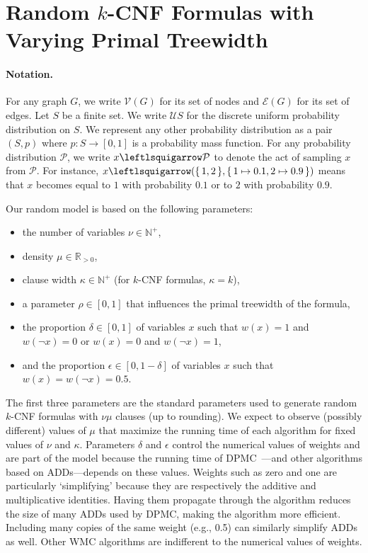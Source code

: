 \documentclass{article}
\theoremstyle{definition}
\begin{document}
\section{Random $k$-CNF Formulas with Varying Primal
  Treewidth}\label{sec:model}

\paragraph{Notation.}
For any graph $G$, we write $\mathcal{V}(G)$ for its set of nodes and
$\mathcal{E}(G)$ for its set of edges. Let $S$ be a finite set. We write
$\mathcal{U}S$ for the discrete uniform probability distribution on $S$. We
represent any other probability distribution as a pair $(S, p)$ where $p\colon S
\to [0, 1]$ is a probability mass function. For any probability distribution
$\mathcal{P}$, we write $x \leftlsquigarrow \mathcal{P}$ to denote the act of
sampling $x$ from $\mathcal{P}$. For instance, $x \leftlsquigarrow (\{\, 1, 2 \,\}, \{\, 1 \mapsto 0.1, 2 \mapsto 0.9 \,\})$ means that $x$ becomes equal to $1$ with probability $0.1$ or to $2$ with probability $0.9$.

Our random model is based on the following parameters:
\begin{itemize}
\item the number of variables $\nu \in \mathbb{N}^+$,
\item density $\mu \in \mathbb{R}_{>0}$,
\item clause width $\kappa \in \mathbb{N}^+$ (for $k$-CNF formulas, $\kappa =
  k$),
\item a parameter $\rho \in [0, 1]$ that influences the primal treewidth of
  the formula,
\item the proportion $\delta \in [0, 1]$ of variables $x$ such that $w(x) = 1$
  and $w(\neg x) = 0$ or $w(x) = 0$ and $w(\neg x) = 1$,
\item and the proportion $\epsilon \in [0, 1-\delta]$ of variables $x$ such that
  $w(x) = w(\neg x) = 0.5$.
\end{itemize}
The first three parameters are the standard parameters used to generate random
$k$-CNF formulas with $\nu\mu$ clauses (up to rounding). We expect to observe
(possibly different) values of $\mu$ that maximize the running time of each
algorithm for fixed values of $\nu$ and $\kappa$. Parameters $\delta$ and
$\epsilon$ control the numerical values of weights and are part of the model
because the running time of \textsc{DPMC}~\cite{DBLP:conf/cp/DudekPV20}---and
other algorithms based on ADDs---depends on these values. Weights such as zero
and one are particularly `simplifying' because they are respectively the
additive and multiplicative identities. Having them propagate through the
algorithm reduces the size of many ADDs used by \textsc{DPMC}, making the
algorithm more efficient. Including many copies of the same weight (e.g., 0.5)
can similarly simplify ADDs as well. Other \textsf{WMC} algorithms are
indifferent to the numerical values of weights.
\end{document}

